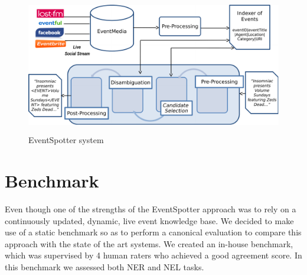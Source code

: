 \documentclass[10pt,a4paper]{article}
\begin{document}
%
%
%
%
%
%	
%
%	 

\begin{figure}
\includegraphics [width=13cm,height=6cm]{architecture}
\caption{EventSpotter system}
\label{fig:architecture}
\end{figure}


\section{Benchmark}
Even though one of the strengths of the EventSpotter approach was to rely on a continuously updated, dynamic, live event knowledge base. We decided to make use of a static benchmark so as to perform a canonical evaluation to compare this approach with the state of the art systems. We created an in-house benchmark, which was supervised by 4 human raters who achieved a good agreement score. In this benchmark we assessed both NER and NEL tasks.
\end{document}
